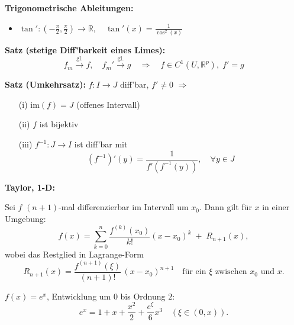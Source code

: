 \begin{itemize}
\textbf{Trigonometrische Ableitungen:}
\begin{itemize}
  \item \(\tan': \left(-\tfrac{\pi}{2}, \tfrac{\pi}{2}\right) \to \mathbb{R}, \quad \tan'(x) = \frac{1}{\cos^2(x)}\)
\end{itemize}

\textbf{Satz (stetige Diff'barkeit eines Limes):}  
\[
f_m \xrightarrow{\text{gl.}} f,\quad f_m' \xrightarrow{\text{gl.}} g
\quad\Rightarrow\quad f \in C^1(U, \mathbb{R}^p),\; f' = g
\]


\textbf{Satz (Umkehrsatz):}  
\(f: I \to J\) diff'bar, \(f' \ne 0\)  
\(\Rightarrow\)
\begin{itemize}
  \item[(i)] \(\text{im}(f) = J\) (offenes Intervall)
  \item[(ii)] \(f\) ist bijektiv
  \item[(iii)] \(f^{-1}: J \to I\) ist diff'bar mit  
    \[
    (f^{-1})'(y) = \frac{1}{f'(f^{-1}(y))}, \quad \forall y \in J
    \]
\end{itemize}

\textbf{Taylor, 1-D:}
\begin{theorem}
  Sei $f$ $(n+1)$-mal differenzierbar im Intervall um $x_0$. Dann gilt für $x$ in einer Umgebung:
  \[
    f(x) = \sum_{k=0}^n \frac{f^{(k)}(x_0)}{k!}(x - x_0)^k 
    \;+\; R_{n+1}(x),
  \]
  wobei das Restglied in Lagrange-Form
  \[
    R_{n+1}(x) = \frac{f^{(n+1)}(\xi)}{(n+1)!}\,(x - x_0)^{n+1}
    \quad\text{für ein }\xi\text{ zwischen }x_0\text{ und }x.
  \]
\end{theorem}
\begin{example}
  $f(x) = e^x$, Entwicklung um $0$ bis Ordnung $2$:
  \[
    e^x = 1 + x + \frac{x^2}{2} + \frac{e^\xi}{6} x^3 \quad(\xi\in(0,x)).
  \]
\end{example}


\end{itemize}
